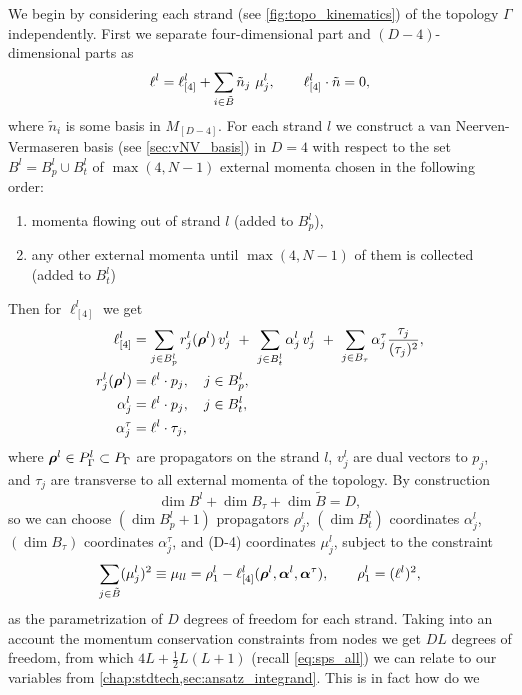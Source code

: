 We begin by considering each strand (see \cref{fig:topo_kinematics}) of the topology $\Gamma$ independently.
First we separate four-dimensional part and $(D-4)$-dimensional parts as
\begin{equation}
  \ell^l = \ell_{[4]}^l + \sum_{i\in \tilde{B}} \tilde{n}_j~\mu^l_{j}, \qquad \sp(\ell^l_{[4]},\tilde{n}) = 0, 
\end{equation}
where $\tilde{n}_i$ is some basis in $M_{[D-4]}$.
For each strand $l$ we construct a van Neerven-Vermaseren basis (see \cref{sec:vNV_basis})
in $D=4$ with respect to the set $B^l = B^l_p \cup B^l_t$ of $\max(4,N-1)$ external momenta chosen in the following order:
\begin{enumerate}
  \item momenta flowing out of strand $l$ (added to $B^l_p$),
  \item any other external momenta until $\max(4,N-1)$ of them is collected (added to $B^l_t$)
\end{enumerate}
Then for $\ell^l_{[4]}$ we get
\begin{subequations}
  \label{eq:lparametrization}
  \begin{align}
    \ell^l_{[4]} &= \sum_{j\in B^l_p} r^l_j(\vb*{\rho}^l)\,v^l_j ~+~ \sum_{j\in B^l_t} \alpha^l_j\,v^l_j ~+~\sum_{j\in B_\tau} \alpha^\tau_j \frac{\tau_j}{(\tau_j)^2}, \\
    \label{eq:lparametrization_b}
    r_j^l(\vb*{\rho}^l) &=  \sp(\ell^l, p_j), \quad j\in B^l_p,    \\ 
    \label{eq:lparametrization_c}
    \alpha_j^l &=  \sp(\ell^l, p_j),\quad j\in B^l_t, \\
    \label{eq:lparametrization_d}
    \alpha_j^\tau &=  \sp(\ell^l, \tau_j),
  \end{align}
\end{subequations}
where $\vb*{\rho}^l \in P_\Gamma^l \subset P_\Gamma$ are propagators on the strand $l$,
$v^l_j$ are dual vectors to $p_j$, and $\tau_j$ are transverse to all external momenta of the topology.
By construction \[\dim{B^l} + \dim{B_\tau} +\dim{\tilde{B}}=D,\] 
so we can choose 
$(\dim{B^l_p}+1)$ propagators $\rho^l_j$,  $(\dim{B^l_t})$ coordinates $\alpha^l_j$, $(\dim{B_\tau})$ coordinates $\alpha^\tau_j$,
and (D-4) coordinates $\mu^l_j$, subject to the constraint
\[
  \sum_{j\in \tilde{B}} (\mu^l_j)^2 \equiv \mu_{ll}  = \rho^l_1 - \ell^l_{[4]}(\vb*{\rho}^l,\vb*{\alpha}^l,\vb*{\alpha}^\tau), \qquad \rho^l_1 = (\ell^l)^2,
\]
as the parametrization of $D$ degrees of freedom for each strand.
Taking into an account the momentum conservation constraints from nodes we get $D L$ degrees of freedom,
from which $4 L +\frac{1}{2}L(L+1)$ (recall \cref{eq:sps_all}) we can relate to our variables from \cref{chap:stdtech,sec:ansatz_integrand}.
This is in fact how do we



